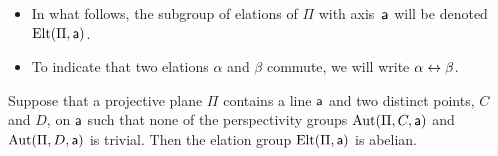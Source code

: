 \begin{ntn}${}$
    \begin{itemize}
        \item In what follows, the subgroup of elations of\/ $\Pi$ with axis\/~$\mathsf a$ will be denoted\/ $\mathrm{Elt}(\Pi,\mathsf a)$.

        \item To indicate that two elations\/ $\alpha$ and $\beta$ commute, we will write\/ $\alpha\mathrel\leftrightarrow\beta$.
    \end{itemize}
\end{ntn}

\begin{thm}\label{thm:abelian-elation-group}
    Suppose that a projective plane\/ $\Pi$ contains a line\/ $\mathsf a$ and two distinct\/ points, $C$ and\/ $D$, on\/ $\mathsf a$ such that none of the perspectivity groups\/ $\operatorname{Aut}(\Pi, C, \mathsf a)$ and\/ $\operatorname{Aut}(\Pi, D, \mathsf a)$ is trivial. Then the elation group\/ $\mathrm{Elt}(\Pi, \mathsf a)$ is abelian.
\end{thm}


